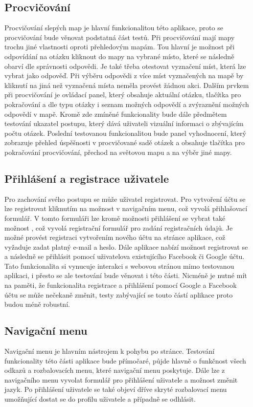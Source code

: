 \documentclass[
    color,   %
	table,   %
    twoside, %
    nolot, nolof
]{fithesis3}
\begin{document}
\subsection{Procvičování}
Procvičování slepých map je hlavní funkcionalitou této aplikace, proto se procvičování bude věnovat podstatná část testů. Při procvičování mají mapy trochu jiné vlastnosti oproti přehledovým mapám. Tou hlavní je možnost při odpovídání na otázku kliknout do mapy na vybrané místo, které se následně obarví dle správnosti odpovědi. Je také třeba otestovat vyznačení míst, která lze vybrat jako odpověď. Při výběru odpovědi z více míst vyznačených na mapě by kliknutí na jiná než vyznačená místa neměla provést žádnou akci. Dalším prvkem při procvičování je ovládací panel, který obsahuje aktuální otázku, tlačítka pro pokračování a dle typu otázky i seznam možných odpovědí a zvýraznění možných odpovědí v mapě. Kromě zde zmíněné funkcionality bude dále předmětem testování ukazatel postupu, který dává uživateli vizuální informaci o zbývajícím počtu otázek. Poslední testovanou funkcionalitou bude panel vyhodnocení, který zobrazuje přehled úspěšnosti v procvičované sadě otázek a obsahuje tlačítka pro pokračování procvičování, přechod na světovou mapu a na výběr jiné mapy.

\subsection{Přihlášení a registrace uživatele}
Pro zachování svého postupu se může uživatel registrovat. Pro vytvoření účtu se lze registrovat kliknutím na možnost  v navigačním menu, což vyvolá přihlašovací formulář. V tomto formuláři lze kromě možnosti přihlášení se vybrat také možnost , což vyvolá registrační formulář pro zadání registračních údajů. Je možné provést registraci vytvořením nového účtu na stránce aplikace, což vyžaduje zadat platný e-mail a heslo. Dále aplikace nabízí možnost registrovat se a následně se přihlásit pomocí uživatelova existujícího Facebook či Google účtu. Tato funkcionalita si vynucuje interakci s webovou stránou mimo testovanou aplikaci, i přesto se ale testování bude věnovat i této části. Nicméně je nutné mít na paměti, že funkcionalita registrace a přihlášení pomocí Google a Facebook účtu se může nečekaně změnit, testy zabývající se touto částí aplikace proto budou méně robustní.

\subsection{Navigační menu}
Navigační menu je hlavním nástrojem k pohybu po stránce. Testování funkcionality této části aplikace bude přímočaré, půjde hlavně o funkčnost všech odkazů a rozbalovacích menu, které navigační menu poskytuje. Dále lze z navigačního menu vyvolat formulář pro přihlášení uživatele a možnost změnit jazyk. Po přihlášení uživatele se také objeví dříve skryté rozbalovací menu umožňující dostat se do profilu uživatele a případně se odhlásit.
\end{document}
